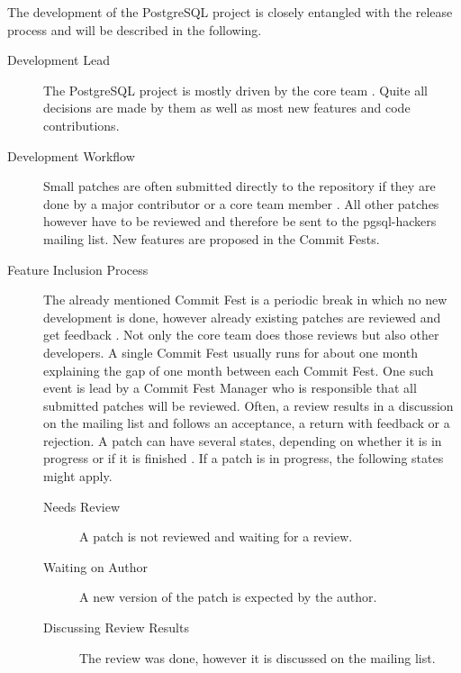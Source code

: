 The development of the PostgreSQL project is closely entangled with the release
process and will be described in the following.

\begin{description}

  \item[Development Lead] The PostgreSQL project is mostly driven by the core
    team \cite{PostgreSQLDevFAQ,PostgreSQLFAQ,PostgreSQLContributors}. Quite
    all decisions are made by them as well as most new features and code
    contributions.

  \item[Development Workflow] Small patches are often submitted directly to the
    repository if they are done by a major contributor or a core team member
    \cite{PostgreSQLDevFAQ}. All other patches however have to be reviewed and
    therefore be sent to the pgsql-hackers mailing list. New features are
    proposed in the Commit Fests.

  \item[Feature Inclusion Process] The already mentioned Commit Fest is a
    periodic break in which no new development is done, however already
    existing patches are reviewed and get feedback \cite{PostgreSQLCommitFest}.
    Not only the core team does those reviews but also other developers. A
    single Commit Fest usually runs for about one month explaining the gap of
    one month between each Commit Fest. One such event is lead by a Commit Fest
    Manager who is responsible that all submitted patches will be reviewed.
    Often, a review results in a discussion on the mailing list and follows an
    acceptance, a return with feedback or a rejection. A patch can have several
    states, depending on whether it is in progress or if it is finished
    \cite{PostgreSQLCommitFestRunning}. If a patch is in progress, the
    following states might apply.

    \begin{description}

      \item[Needs Review] A patch is not reviewed and waiting for a review.

      \item[Waiting on Author] A new version of the patch is expected by the
        author.

      \item[Discussing Review Results] The review was done, however it is
        discussed on the mailing list.


\end{description}
\end{description}
